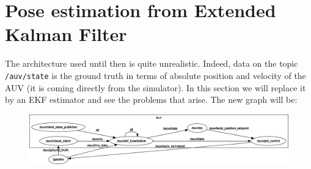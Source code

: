 \documentclass{ecnreport}
\begin{document}
%
%
%

%

\section{Pose estimation from Extended Kalman Filter}

The architecture used until then is quite unrealistic.
Indeed, data on the topic \texttt{/auv/state} is the ground truth in terms of absolute position and velocity of the AUV (it is coming
directly from the simulator).
In this section we will replace it by an EKF estimator and see the problems that arise. The new graph will be:
\begin{figure}[h]\centering
 \includegraphics[width=\linewidth]{graph_ekf}
\end{figure}
\end{document}
